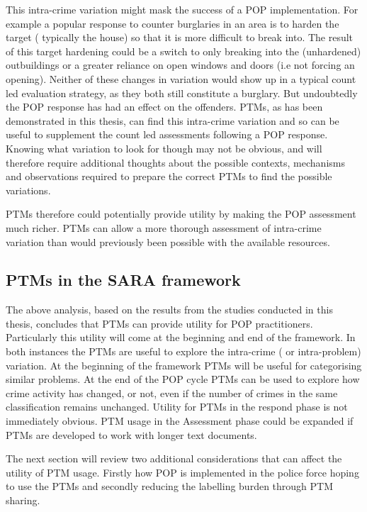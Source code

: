 This intra-crime variation might mask the success of a POP implementation. For example a popular response to counter burglaries in an area is to harden the target ( typically the house) so that it is more difficult to break into. The result of this target hardening could be a switch to only breaking into the (unhardened) outbuildings or a greater reliance on open windows and doors (i.e not forcing an opening). Neither of these changes in variation would show up in a typical count led evaluation strategy, as they both still constitute a burglary. But undoubtedly the POP response has had an effect on the offenders. PTMs, as has been demonstrated in this thesis, can find this intra-crime variation and so can be useful to supplement the count led assessments following a POP response. Knowing what variation to look for though may not be obvious, and will therefore require additional thoughts about the possible contexts, mechanisms and observations required \parencite{pawson1997realistic} to prepare the correct PTMs to find the possible variations.

PTMs therefore could potentially provide utility by making the POP assessment much richer. PTMs can allow a more thorough assessment of intra-crime variation than would previously been possible with the available resources. 


\subsection{PTMs in the SARA framework} The above analysis, based on the results from the studies conducted in this thesis, concludes that PTMs can provide utility for POP practitioners. Particularly this utility will come at the beginning and end of the framework. In both instances the PTMs are useful to explore the intra-crime ( or intra-problem) variation. At the beginning of the framework  PTMs will be useful for categorising similar problems. At the end of the POP cycle PTMs can be used to explore how crime activity has changed, or not, even if the number of crimes in the same classification remains unchanged. Utility for PTMs in the respond phase is not immediately obvious. PTM usage in the Assessment phase could be expanded if PTMs are developed to work with longer text documents. 

The next section will review two additional considerations that can affect the utility of PTM usage. Firstly how POP is implemented in the police force hoping to use the PTMs and secondly reducing the labelling burden through PTM sharing.

